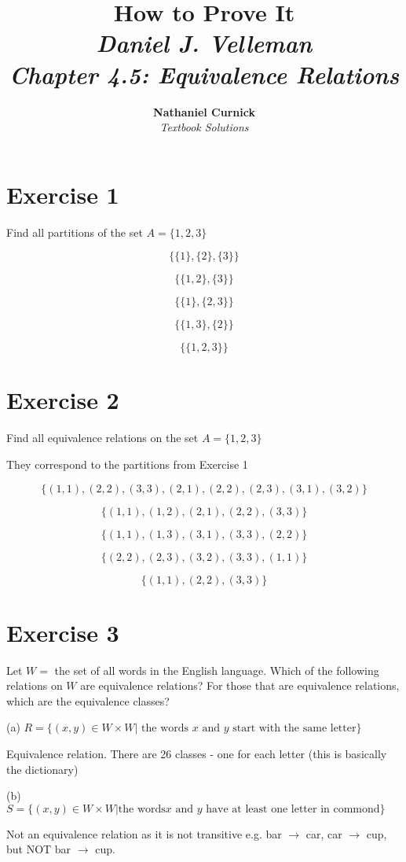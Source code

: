 \documentclass[11pt]{article}
\title{\textbf{How to Prove It} \\ {\Large\itshape Daniel J. Velleman} \\ {\Large\itshape Chapter 4.5: Equivalence Relations}}
\author{\textbf{Nathaniel Curnick} \\ \textit{Textbook Solutions}}
\date{}
\begin{document}
\maketitle

\section*{Exercise 1}

Find all partitions of the set $A = \{1,2,3\}$

$$\{\{1\}, \{2\}, \{3\}\}$$

$$\{\{1,2\}, \{3\}\}$$

$$\{\{1\}, \{2,3\}\}$$

$$\{\{1,3\}, \{2\}\}$$

$$\{\{1,2,3\}\}$$

\section*{Exercise 2}

Find all equivalence relations on the set $A = \{1,2,3\}$

They correspond to the partitions from Exercise 1

$$\{(1,1),(2,2),(3,3),(2,1),(2,2),(2,3),(3,1),(3,2)\}$$

$$\{(1,1),(1,2),(2,1),(2,2),(3,3)\}$$

$$\{(1,1),(1,3),(3,1),(3,3),(2,2)\}$$

$$\{(2,2),(2,3),(3,2),(3,3),(1,1)\}$$

$$\{(1,1),(2,2),(3,3)\}$$

\section*{Exercise 3}

Let $W =$ the set of all words in the English language. Which of the following 
relations on $W$ are equivalence relations? For those that are equivalence
relations, which are the equivalence classes?

\noindent (a) $R = \{(x,y) \in W \times W | \text{ the words } x \text{ and } y \text{ start with the same letter}\}$

Equivalence relation. There are 26 classes - one for each letter (this is basically the dictionary)

\noindent (b) $S = \{(x,y) \in W \times W | \text{the words} x \text{ and } y \text{ have at least one letter in commond}\}$

Not an equivalence relation as it is not transitive e.g. 
bar $\rightarrow$ car, car $\rightarrow$ cup, but NOT bar $\rightarrow$ cup.
\end{document}
